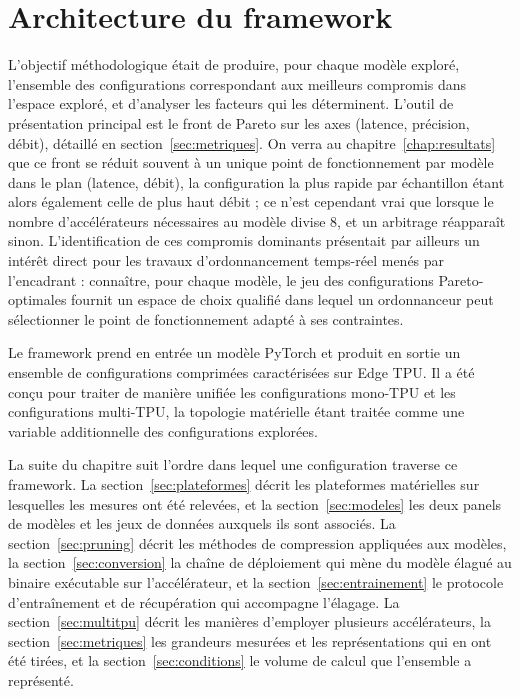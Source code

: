\documentclass[11pt,a4paper]{report}
\begin{document}
\section{Architecture du framework}

L'objectif méthodologique était de produire, pour chaque modèle exploré, l'ensemble des configurations correspondant aux meilleurs compromis dans l'espace exploré, et d'analyser les facteurs qui les déterminent. L'outil de présentation principal est le front de Pareto sur les axes (latence, précision, débit), détaillé en section~\ref{sec:metriques}. On verra au chapitre~\ref{chap:resultats} que ce front se réduit souvent à un unique point de fonctionnement par modèle dans le plan (latence, débit), la configuration la plus rapide par échantillon étant alors également celle de plus haut débit ; ce n'est cependant vrai que lorsque le nombre d'accélérateurs nécessaires au modèle divise 8, et un arbitrage réapparaît sinon. L'identification de ces compromis dominants présentait par ailleurs un intérêt direct pour les travaux d'ordonnancement temps-réel menés par l'encadrant : connaître, pour chaque modèle, le jeu des configurations Pareto-optimales fournit un espace de choix qualifié dans lequel un ordonnanceur peut sélectionner le point de fonctionnement adapté à ses contraintes.

Le framework prend en entrée un modèle PyTorch et produit en sortie un ensemble de configurations comprimées caractérisées sur Edge TPU. Il a été conçu pour traiter de manière unifiée les configurations mono-TPU et les configurations multi-TPU, la topologie matérielle étant traitée comme une variable additionnelle des configurations explorées.

La suite du chapitre suit l'ordre dans lequel une configuration traverse ce framework. La section~\ref{sec:plateformes} décrit les plateformes matérielles sur lesquelles les mesures ont été relevées, et la section~\ref{sec:modeles} les deux panels de modèles et les jeux de données auxquels ils sont associés. La section~\ref{sec:pruning} décrit les méthodes de compression appliquées aux modèles, la section~\ref{sec:conversion} la chaîne de déploiement qui mène du modèle élagué au binaire exécutable sur l'accélérateur, et la section~\ref{sec:entrainement} le protocole d'entraînement et de récupération qui accompagne l'élagage. La section~\ref{sec:multitpu} décrit les manières d'employer plusieurs accélérateurs, la section~\ref{sec:metriques} les grandeurs mesurées et les représentations qui en ont été tirées, et la section~\ref{sec:conditions} le volume de calcul que l'ensemble a représenté.
\end{document}
